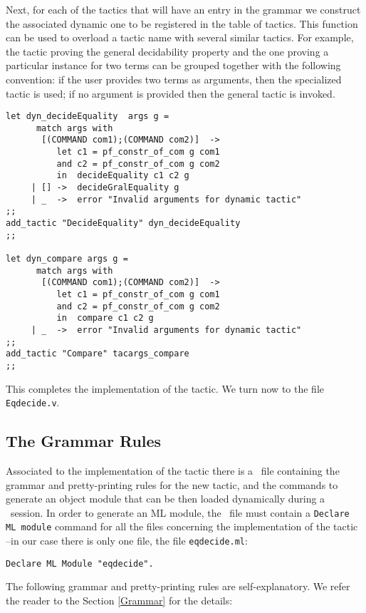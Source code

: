 Next, for each of the tactics that will have an entry in the grammar
we construct the associated dynamic one to be registered in the table
of tactics. This function can be used to overload a tactic name with
several similar tactics.  For example, the tactic proving the general
decidability property and the one proving a particular instance for
two terms can be grouped together with the following convention: if
the user provides two terms as arguments, then the specialized tactic
is used; if no argument is provided then the general tactic is invoked.

\begin{verbatim}
let dyn_decideEquality  args g =
      match args with 
       [(COMMAND com1);(COMMAND com2)]  -> 
          let c1 = pf_constr_of_com g com1
          and c2 = pf_constr_of_com g com2
          in  decideEquality c1 c2 g 
     | [] ->  decideGralEquality g
     | _  ->  error "Invalid arguments for dynamic tactic"
;;
add_tactic "DecideEquality" dyn_decideEquality
;;

let dyn_compare args g =
      match args with 
       [(COMMAND com1);(COMMAND com2)]  -> 
          let c1 = pf_constr_of_com g com1
          and c2 = pf_constr_of_com g com2
          in  compare c1 c2 g
     | _  ->  error "Invalid arguments for dynamic tactic"
;; 
add_tactic "Compare" tacargs_compare
;;
\end{verbatim}

This completes the implementation of the tactic. We turn now to the
\Coq file \texttt{Eqdecide.v}.


\subsection{The Grammar Rules}

Associated to the implementation of the tactic there is a \Coq\ file
containing the grammar and pretty-printing rules for the new tactic,
and the commands to generate an object module that can be then loaded
dynamically during a \Coq\ session. In order to generate an ML module,
the \Coq\ file must contain a
\texttt{Declare ML module} command for all the \ocaml{} files concerning
the implementation of the tactic --in our case there is only one file,
the file \texttt{eqdecide.ml}: 

\begin{verbatim}
Declare ML Module "eqdecide".
\end{verbatim}

The following grammar and pretty-printing rules are
self-explanatory. We refer the reader to the Section \ref{Grammar} for
the details:

